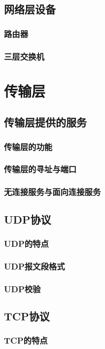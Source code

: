 \documentclass[lang=cn,newtx,10pt,scheme=chinese]{../../elegantbook}
\begin{document}
\section{网络层设备}
\subsection{路由器}
\subsection{三层交换机}

\chapter{传输层}

\section{传输层提供的服务}
\subsection{传输层的功能}
\subsection{传输层的寻址与端口}
\subsection{无连接服务与面向连接服务}

\section{UDP协议}
\subsection{UDP的特点}
\subsection{UDP报文段格式}
\subsection{UDP校验}

\section{TCP协议}
\subsection{TCP的特点}
\end{document}

